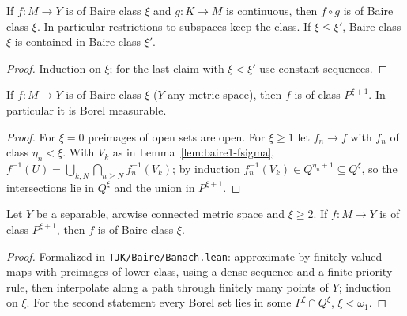 \begin{lemma}\label{lem:baire-precomp}
If $f:M\to Y$ is of Baire class $\xi$ and $g:K\to M$ is continuous, then $f\circ g$ is of Baire class
$\xi$. In particular restrictions to subspaces keep the class. If $\xi\le\xi'$, Baire class $\xi$
is contained in Baire class $\xi'$.
\end{lemma}
\begin{proof}
Induction on $\xi$; for the last claim with $\xi<\xi'$ use constant sequences.
\end{proof}

\begin{lemma}\label{lem:baire-imp-class}
If $f:M\to Y$ is of Baire class $\xi$ ($Y$ any metric space), then $f$ is of class $P^{\xi+1}$. In
particular it is Borel measurable.
\end{lemma}
\begin{proof}
For $\xi=0$ preimages of open sets are open. For $\xi\ge1$ let $f_n\to f$ with $f_n$ of class
$\eta_n<\xi$. With $V_k$ as in Lemma~\ref{lem:baire1-fsigma},
$f^{-1}(U)=\bigcup_{k,N}\bigcap_{n\ge N}f_n^{-1}(V_k)$; by induction $f_n^{-1}(V_k)\in
Q^{\eta_n+1}\subseteq Q^\xi$, so the intersections lie in $Q^\xi$ and the union in $P^{\xi+1}$.
\end{proof}

\begin{theorem}\label{fact:banach}
Let $Y$ be a separable, arcwise connected metric space and $\xi\ge2$. If $f:M\to Y$ is of class
$P^{\xi+1}$, then $f$ is of Baire class $\xi$.
\end{theorem}
\begin{proof}Formalized in \texttt{TJK/Baire/Banach.lean}: approximate by finitely valued maps with preimages of lower class, using a dense sequence and a finite priority rule, then interpolate along a path through finitely many points of $Y$; induction on $\xi$. For the second statement every Borel set lies in some $P^\xi\cap Q^\xi$, $\xi<\omega_1$.\end{proof}

